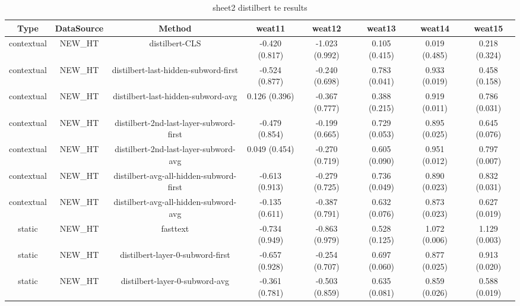 \begin{sidewaystable}[htb]
    \centering
    \caption{sheet2 distilbert te results}
    \label{appendix_tab:sheet2_distilbert_te_results}
    \small
    \begin{tabular}{@{}cccccccc@{}}
        \toprule
        Type & DataSource & Method & weat11 & weat12 & weat13 & weat14 & weat15 \\
        \midrule
        contextual & NEW\_HT & distilbert-CLS & -0.420 (0.817) & -1.023 (0.992) & 0.105 (0.415) & 0.019 (0.485) & 0.218 (0.324) \\
        contextual & NEW\_HT & distilbert-last-hidden-subword-first & -0.524 (0.877) & -0.240 (0.698) & 0.783 (0.041) & 0.933 (0.019) & 0.458 (0.158) \\
        contextual & NEW\_HT & distilbert-last-hidden-subword-avg & 0.126 (0.396) & -0.367 (0.777) & 0.388 (0.215) & 0.919 (0.011) & 0.786 (0.031) \\
        contextual & NEW\_HT & distilbert-2nd-last-layer-subword-first & -0.479 (0.854) & -0.199 (0.665) & 0.729 (0.053) & 0.895 (0.025) & 0.645 (0.076) \\
        contextual & NEW\_HT & distilbert-2nd-last-layer-subword-avg & 0.049 (0.454) & -0.270 (0.719) & 0.605 (0.090) & 0.951 (0.012) & 0.797 (0.007) \\
        contextual & NEW\_HT & distilbert-avg-all-hidden-subword-first & -0.613 (0.913) & -0.279 (0.725) & 0.736 (0.049) & 0.890 (0.023) & 0.832 (0.031) \\
        contextual & NEW\_HT & distilbert-avg-all-hidden-subword-avg & -0.135 (0.611) & -0.387 (0.791) & 0.632 (0.076) & 0.873 (0.023) & 0.627 (0.019) \\
        static & NEW\_HT & fasttext & -0.734 (0.949) & -0.863 (0.979) & 0.528 (0.125) & 1.072 (0.006) & 1.129 (0.003) \\
        static & NEW\_HT & distilbert-layer-0-subword-first & -0.657 (0.928) & -0.254 (0.707) & 0.697 (0.060) & 0.877 (0.025) & 0.913 (0.020) \\
        static & NEW\_HT & distilbert-layer-0-subword-avg & -0.361 (0.781) & -0.503 (0.859) & 0.635 (0.081) & 0.859 (0.026) & 0.588 (0.019) \\
        \bottomrule
    \end{tabular}
\end{sidewaystable}